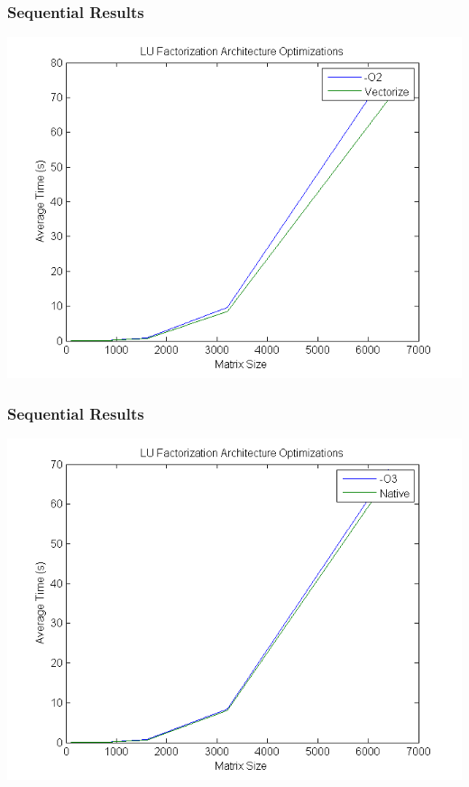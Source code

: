 \documentclass{beamer}
\begin{document}
\begin{frame}
\frametitle{Sequential Results}

\begin{center}
\includegraphics[scale=0.5]{figures/fig3}
\end{center}

\end{frame}

\begin{frame}
\frametitle{Sequential Results}

\begin{center}
\includegraphics[scale=0.5]{figures/fig4}
\end{center}

\end{frame}
\end{document}
